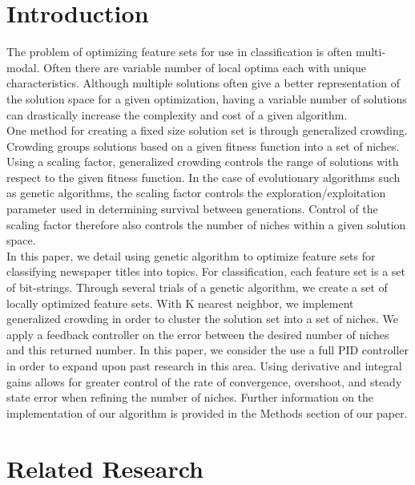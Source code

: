 \documentclass{sig-alternate}
\begin{document}


\section{Introduction}
The problem of optimizing feature sets for use in classification is often multi-modal. Often there are variable number of local optima each with unique characteristics. Although multiple solutions often give a better representation of the solution space for a given optimization, having a variable number of solutions can drastically increase the complexity and cost of a given algorithm.\\
\indent One method for creating a fixed size solution set is through generalized crowding. Crowding groups solutions based on a given fitness function into a set of niches\cite{ole:feedback}. Using a scaling factor, generalized crowding controls the range of solutions  with respect to the given fitness function. In the case of evolutionary algorithms such as genetic algorithms, the scaling factor controls the exploration/exploitation parameter used in determining survival between generations. Control of the scaling factor therefore also controls the number of niches within a given solution space\cite{ole:feedback}.\\
\indent In this paper, we detail using genetic algorithm to optimize feature sets for classifying newspaper titles into topics. For classification, each feature set is a set of bit-strings. Through several trials of a genetic algorithm, we create a set of locally optimized feature sets. With K nearest neighbor, we implement generalized crowding in order to cluster the solution set into a set of niches. We apply a feedback controller on the error between the desired number of niches and this returned number. In this paper, we consider the use a full PID controller in order to expand upon past research in this area. Using derivative and integral gains allows for greater control of the rate of convergence, overshoot, and steady state error when refining the number of  niches. Further information on the implementation of our algorithm is provided in the Methods section of our paper.  

\section{Related Research}
\end{document}

